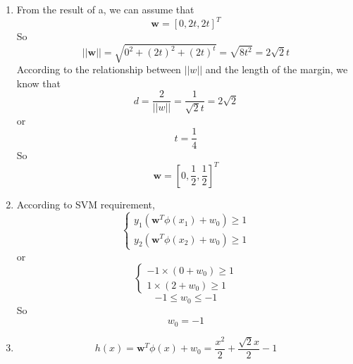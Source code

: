 \documentclass{article}
\begin{document}
\begin{enumerate}[label=\alph*.]
            \item %
            From the result of a, we can assume that
            \begin{equation}
            	\boldsymbol{w} = [0,2t,2t]^T
            \end{equation}
            So
            \begin{equation}
            	||\boldsymbol{w}||
            	=\sqrt{0^2+(2t)^2+(2t)^t}
            	=\sqrt{8t^2}=2\sqrt{2}t
            \end{equation}
            According to the relationship between $||w||$ and the length of the margin, we know that
            \begin{equation}
            	d=\frac{2}{||w||}
            	=\frac{1}{\sqrt{2}t}=2\sqrt{2}
            \end{equation}
            or
            \begin{equation}
            	t=\frac{1}{4}
            \end{equation}
            So
            \begin{equation}
            	\boldsymbol{w}
            	=[0,\frac{1}{2},\frac{1}{2}]^T
            \end{equation}
            
            \item %
            According to SVM requirement,
            \begin{equation}
            	\begin{cases}
               		y_1(\boldsymbol{w}^T\phi(x_1)+w_0)
            		\geqslant 1\\
               		y_2(\boldsymbol{w}^T\phi(x_2)+w_0)
            		\geqslant 1
            	\end{cases}
            \end{equation}
            or
            \begin{equation}
            	\begin{cases}
               		-1\times(0+w_0)
            		\geqslant 1\\
               		1\times(2+w_0)
            		\geqslant 1
            	\end{cases}
            \end{equation}
            \begin{equation}
            	-1 \leqslant w_0 \leqslant -1
            \end{equation}
            So
            \begin{equation}
            	w_0 = -1
            \end{equation}
            
            \item %
            \begin{equation}
            	h(x)=\boldsymbol{w}^T\phi(x)+w_0
            	=\frac{x^2}{2}+\frac{\sqrt{2}x}{2}-1
            \end{equation}
        \end{enumerate}    
        
\end{document}
